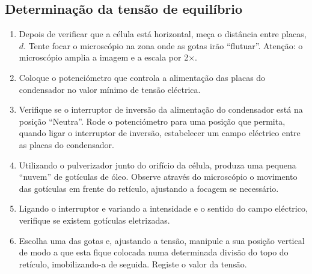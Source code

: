 \documentclass[a4paper,twoside,11pt]{report}      %
\begin{document}
\subsection{\sf Determinação da tensão de equilíbrio}
\begin{enumerate}
\item   Depois de verificar que a célula está horizontal, meça o distância entre placas, $d$. Tente focar o microscópio na zona onde as gotas irão ``flutuar''. Atenção: o microscópio amplia a imagem e a escala por 2$\times$.

\item Coloque o potenciómetro que controla a alimentação das placas do condensador no valor mínimo de tensão eléctrica. 

\item    Verifique se o interruptor de inversão da alimentação do condensador está na posição ``Neutra''. Rode o potenciómetro para uma posição que permita, quando ligar o interruptor de inversão, estabelecer um campo eléctrico entre as placas do condensador. 

\item     Utilizando o pulverizador junto do orifício da célula, produza uma pequena ``nuvem'' de gotículas de óleo. Observe através do microscópio o movimento das gotículas em frente do retículo, ajustando a focagem se necessário.

\item     Ligando o interruptor e variando a intensidade  e o  sentido do campo eléctrico, verifique se existem gotículas eletrizadas. 

 \item Escolha uma das gotas e, ajustando a tensão, manipule a sua posição vertical de modo a que esta fique colocada numa determinada divisão do topo do retículo, imobilizando-a de seguida. Registe o valor da tensão. 
 \end{enumerate}
 
\end{document}
